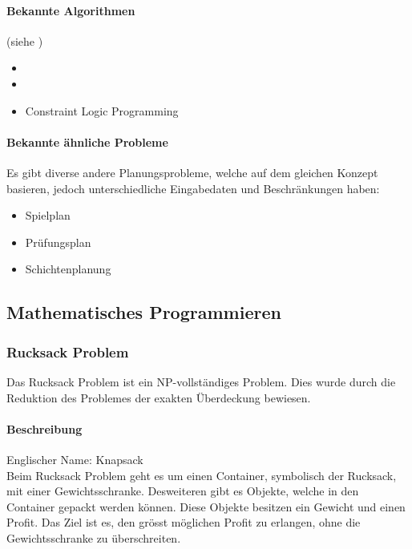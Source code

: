 	\paragraph{Bekannte Algorithmen}
	(siehe \cite{framework_timetabling})
	\begin{itemize}
		\item {}
		\item {}
		\item Constraint Logic Programming
	\end{itemize}	

	\paragraph{Bekannte ähnliche Probleme}	
	Es gibt diverse andere Planungsprobleme, welche auf dem gleichen Konzept basieren, jedoch unterschiedliche Eingabedaten und Beschränkungen haben:
	\begin{itemize}
		\item Spielplan
		\item Prüfungsplan
		\item Schichtenplanung
	\end{itemize}

\subsection{Mathematisches Programmieren}\label{mathematical_programming}

	\subsubsection{Rucksack Problem}\label{knapsack}
	Das Rucksack Problem ist ein NP-vollständiges Problem. Dies wurde durch die Reduktion des Problemes der exakten Überdeckung bewiesen.

	\paragraph{Beschreibung}
	Englischer Name: Knapsack\\
	Beim Rucksack Problem geht es um einen Container, symbolisch der Rucksack, mit einer Gewichtsschranke. Desweiteren gibt es Objekte, welche in den Container gepackt werden 
	können. Diese Objekte besitzen ein Gewicht und einen Profit. Das Ziel ist es, den grösst möglichen Profit zu erlangen, ohne die Gewichtsschranke zu überschreiten. 
	\cite{knapsack_desc_web}


